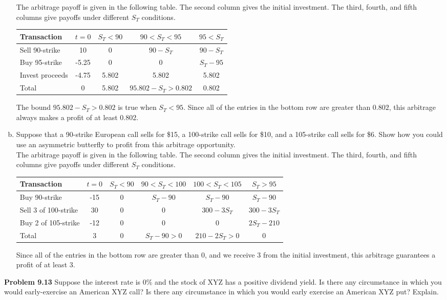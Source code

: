 \documentclass[12pt]{article}
\newcommand{\problem}[1]{\bigskip \noindent \textbf{Problem #1}}
\theoremstyle{plain}
\begin{document}
\begin{enumerate}[(a)]
The arbitrage payoff is given in the following table. The second column gives the initial investment. The third, fourth, and fifth columns give payoffs under different $S_T$ conditions.
\begin{center}
\begin{tabular}{l||cccc}
Transaction & $t = 0$ & $S_T < 90$ & $90 < S_T < 95$ & $95 < S_T$ \\ \hline \hline
Sell 90-strike & 10 & 0 & $90-S_T$ & $90-S_T$\\
Buy 95-strike & -5.25 & 0 & 0 & $S_T - 95$\\
Invest proceeds & -4.75 & 5.802 & 5.802 & 5.802\\
Total & 0 & 5.802 & $95.802 - S_T > 0.802$ & 0.802
\end{tabular}
\end{center}
The bound $95.802 - S_T > 0.802$ is true when $S_T < 95$. Since all of the entries in the bottom row are greater than $0.802$, this arbitrage always makes a profit of at least 0.802.

\item Suppose that a 90-strike European call sells for \$15, a 100-strike call sells for \$10, and a 105-strike call sells for \$6. Show how you could use an asymmetric butterfly to profit from this arbitrage opportunity.\\

The arbitrage payoff is given in the following table. The second column gives the initial investment. The third, fourth, and fifth columns give payoffs under different $S_T$ conditions.
\begin{center}
\begin{tabular}{l||ccccc}
Transaction & $t = 0$ & $S_T < 90$ & $90 < S_T < 100$ & $100 < S_T < 105$ & $S_T > 95$ \\ \hline \hline
Buy 90-strike & -15 & 0 & $S_T - 90$ & $S_T - 90$ & $S_T - 90$\\
Sell 3 of 100-strike & 30 & 0 & 0 & $300 - 3S_T$ & $300 - 3S_T$\\
Buy 2 of 105-strike & -12 & 0 & 0 & 0 & $2S_T - 210$\\
Total & 3 & 0 & $S_T - 90 > 0$ & $210 - 2S_T > 0$ & 0
\end{tabular}
\end{center}
Since all of the entries in the bottom row are greater than 0, and we receive 3 from the initial investment, this arbitrage guarantees a profit of at least 3.
\end{enumerate}

\problem{9.13} Suppose the interest rate is 0\% and the stock of XYZ has a positive dividend yield. Is there any circumstance in which you would early-exercise an American XYZ call? Is there any circumstance in which you would early exercise an American XYZ put? Explain.\\
\end{document}
